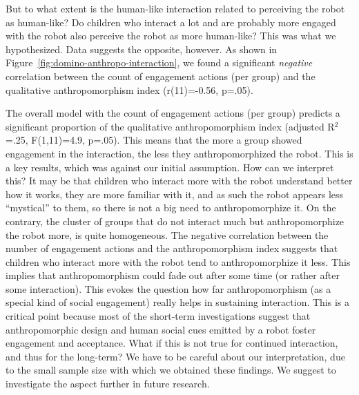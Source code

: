 \documentclass{sig-alternate}
\begin{document}
But to what extent is the human-like interaction related to perceiving the robot
as human-like? Do children who interact a lot and are probably more engaged with
the robot also perceive the robot as more human-like? This was what we
hypothesized. Data suggests the opposite, however. As shown in
Figure~\ref{fig:domino-anthropo-interaction}, we found a significant
\textit{negative} correlation between the count of engagement actions (per
group) and the qualitative anthropomorphism index (r(11)=-0.56, p=.05).


The overall model with the count of engagement actions (per group) predicts a
significant proportion of the qualitative anthropomorphism index (adjusted
R$^2$=.25, F(1,11)=4.9, p=.05). This means that the more a group showed
engagement in the interaction, the less they anthropomorphized the robot. This
is a key results, which was against our initial assumption. How can we interpret
this? It may be that children who interact more with the robot understand better
how it works, they are more familiar with it, and as such the robot appears less
``mystical'' to them, so there is not a big need to anthropomorphize it. On the
contrary, the cluster of groups that do not interact much but anthropomorphize
the robot more, is quite homogeneous. The negative correlation between the
number of engagement actions and the anthropomorphism index suggests that
children who interact more with the robot tend to anthropomorphize it less. This
implies that anthropomorphism could fade out after some time (or rather after
some interaction). This evokes the question how far anthropomorphism (as a
special kind of social engagement) really helps in sustaining interaction. This
is a critical point because most of the short-term investigations suggest that
anthropomorphic design and human social cues emitted by a robot foster
engagement and acceptance. What if this is not true for continued interaction,
and thus for the long-term?  We have to be careful about our interpretation, due
to the small sample size with which we obtained these findings. We suggest to
investigate the aspect further in future research.
\end{document}
